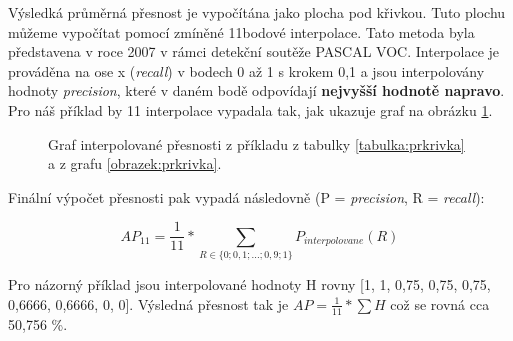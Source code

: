 Výsledká průměrná přesnost je vypočítána jako plocha pod křivkou. Tuto plochu můžeme vypočítat pomocí zmíněné 11bodové interpolace. Tato metoda byla představena v roce 2007 v rámci detekční soutěže PASCAL VOC. Interpolace je prováděna na ose x (\emph{recall}) v bodech 0 až 1 s krokem 0,1 a jsou interpolovány hodnoty \emph{precision}, které v daném bodě odpovídají \textbf{nejvyšší hodnotě napravo}. Pro náš příklad by 11 interpolace vypadala tak, jak ukazuje graf na obrázku \ref{obrazek:interpolace}.

\begin{figure}[H] 
  \begin{center}
  \label{obrazek:interpolace}
  \caption{Graf interpolované přesnosti z příkladu z tabulky \ref{tabulka:prkrivka} a z grafu \ref{obrazek:prkrivka}.}
  \end{center}
\end{figure}

\noindent Finální výpočet přesnosti pak vypadá následovně \cite{interpolace, detekceMetriky} (P = \emph{precision}, R = \emph{recall}):

\begin{equation}
  AP_{11} = \frac{1}{11} * \sum_{R \in \{0;0,1;...;0,9;1\}} P_{interpolovane} (R)
\end{equation}

Pro názorný příklad jsou interpolované hodnoty H rovny [1, 1, 0,75, 0,75, 0,75, 0,6666, 0,6666, 0, 0]. Výsledná přesnost tak je $AP = \frac{1}{11} * \sum H$ což se rovná cca 50,756 \%.

